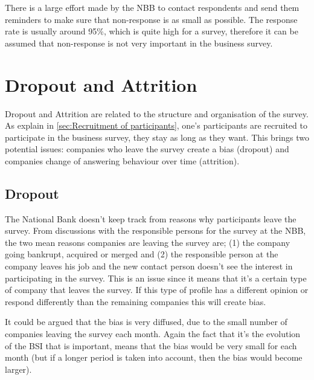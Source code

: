 \documentclass[12pt,a4paper,oneside]{book}
\begin{document}
There is a large effort made by the NBB to contact respondents and send them reminders to make sure that non-response is as small as possible.
The response rate is usually around 95\%, which is quite high for a survey, therefore it can be assumed that non-response is not very important in the business survey.





\section{Dropout and Attrition}

Dropout and Attrition are related to the structure and organisation of the survey. 
As explain in \autoref{sec:Recruitment of participants}, one's participants are recruited to participate in the business survey, they stay as long as they want. This brings two potential issues: companies who leave the survey create a bias (dropout) and companies change of answering behaviour over time (attrition).

\subsection{Dropout}

The National Bank doesn't keep track from reasons why participants leave the survey. From discussions with the responsible persons for the survey at the NBB, the two mean reasons companies are leaving the survey are; (1) the company going bankrupt, acquired or merged and (2) the responsible person at the company leaves his job and the new contact person doesn't see the interest in participating in the survey.
This is an issue since it means that it's a certain type of company that leaves the survey. If this type of profile has a different opinion or respond differently than the remaining companies this will create bias. 


It could be argued that the bias is very diffused, due to the small number of companies leaving the survey each month. Again the fact that it's the evolution of the BSI that is important, means that the bias would be very small for each month (but if a longer period is taken into account, then the bias would become larger). 
\end{document}
